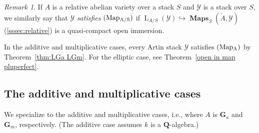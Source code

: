 \documentclass[12pt, oneside]{amsart}
\numberwithin{equation}{section}
\theoremstyle{remark}
\newtheorem{remark}[subsubsection]{Remark}
\theoremstyle{plain}
\DeclareMathOperator{\MAP}{\mathbf{Maps}}
\newcommand{\Loop}{\operatorname{L}}
\newcommand{\YY}{\mathcal{Y}}
\newcommand{\GGa}{\mathbf{G}_{a}}
\newcommand{\GGm}{\mathbf{G}_{m}}
\newcommand{\bQ}{\mathbf{Q}}
\begin{document}
\begin{remark}
	If $A$ is a relative abelian variety over a stack $S$ and $\YY$ is a stack over $S$, we similarly say that $\YY$ \emph{satisfies $(\textup{Map}\textsubscript{A/S})$} if $\Loop_{A/S}(\YY) \hookrightarrow \MAP_S(\check{A}, \YY)$ (\ref{sssec:relative}) is a quasi-compact open immersion.
\end{remark}

In the additive and multiplicative cases, every Artin stack $\YY$ satisfies $(\textup{Map}\textsubscript{A})$ by Theorem~\ref{thm:LGa LGm}.
For the elliptic case, see Theorem~\ref{open in map pluperfect}.

\subsection{The additive and multiplicative cases}

We specialize to the additive and multiplicative cases, i.e., where $A$ is $\GGa$ and $\GGm$, respectively. (The additive case assumes $k$ is a $\bQ$-algebra.)
\end{document}
